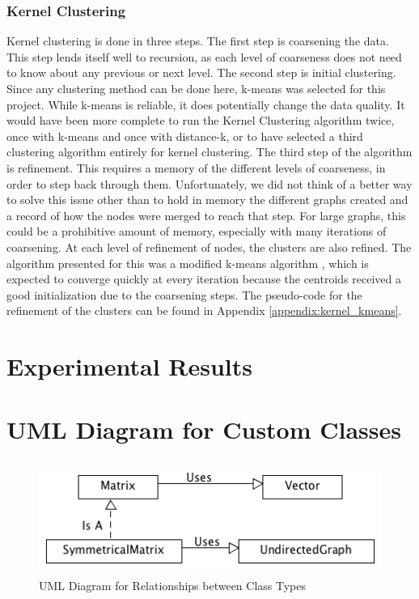 \documentclass[12pt]{article}
\begin{document}
\subsubsection{Kernel Clustering}
Kernel clustering is done in three steps. The first step is coarsening the data. This step lends itself well to recursion, as each level of coarseness does not need to know about any previous or next level. \newline\newline
The second step is initial clustering. Since any clustering method can be done here, k-means was selected for this project. While k-means is reliable, it does potentially change the data quality. It would have been more complete to run the Kernel Clustering algorithm twice, once with k-means and once with distance-k, or to have selected a third clustering algorithm entirely for kernel clustering.
\newline\newline
The third step of the algorithm is refinement. This requires a memory of the different levels of coarseness, in order to step back through them. Unfortunately, we did not think of a better way to solve this issue other than to hold in memory the different graphs created and a record of how the nodes were merged to reach that step. For large graphs, this could be a prohibitive amount of memory, especially with many iterations of coarsening.
\newline\newline
At each level of refinement of nodes, the clusters are also refined. The algorithm presented for this was a modified k-means algorithm \cite{kmeans}, which is expected to converge quickly at every iteration because the centroids received a good initialization due to the coarsening steps. The pseudo-code for the refinement of the clusters can be found in Appendix \ref{appendix:kernel_kmeans}.

\newpage
\section{Experimental Results}

\newpage
\appendix
\appendixpage
\addappheadtotoc

\section{UML Diagram for Custom Classes}
\label{appendix:uml}
\begin{figure}[!htb]
\begin{center}
	\includegraphics[height=10em]{uml.png}
	\caption{UML Diagram for Relationships between Class Types}
\end{center}
\end{figure}
\end{document}

